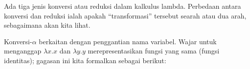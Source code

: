 \documentclass[../../../include/open-logic-section]{subfiles}
\begin{document}

Ada tiga jenis konversi atau reduksi dalam kalkulus lambda. Perbedaan
antara konversi dan reduksi ialah apakah ``transformasi'' tersebut
searah atau dua arah, sebagaimana akan kita lihat.

Konversi-$\alpha$ berkaitan dengan penggantian nama variabel. Wajar untuk
menganggap $\lambda x. x$ dan $\lambda y.y$ merepresentasikan fungsi yang
sama (fungsi identitas); gagasan ini kita formalkan sebagai berikut:
\end{document}
